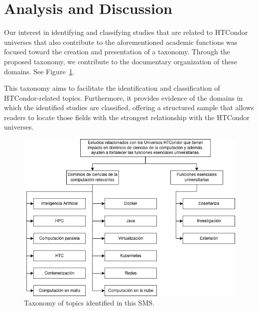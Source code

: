 \section{Analysis and Discussion}\label{sec:analisis-discusion}

Our interest in identifying and classifying studies that are related to HTCondor universes that also contribute to the aforementioned academic functions was focused toward the creation and presentation of a taxonomy. Through the proposed taxonomy, we contribute to the documentary organization of these domains. See Figure~\ref{fig:taxonomia}.

This taxonomy aims to facilitate the identification and classification of HTCondor-related topics. Furthermore, it provides evidence of the domains in which the identified studies are classified, offering a structured sample that allows readers to locate those fields with the strongest relationship with the HTCondor universes.


\begin{figure}[htbp]
	\centering
	\vspace{10pt}
	\includegraphics[scale=0.4]{resources/figures/sms-taxonomia.drawio.png}
	\vspace{6pt}
	\caption{Taxonomy of topics identified in this SMS.}
	\label{fig:taxonomia}
\end{figure}
